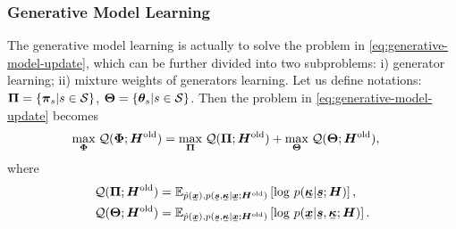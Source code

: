 \documentclass[letterpaper]{article} %
\newcommand{\ubar}[1]{\mkern2mu\underline{\mkern-2mu #1\mkern-2mu}\mkern2mu}
\newcommand{\ubm}[1]{\ubar{\bm{#1}}}
\begin{document}
\subsubsection{Generative Model Learning}
The generative model learning is actually to solve the problem in \eqref{eq:generative-model-update}, which can be further divided into two subproblems: i) generator learning; ii) mixture weights of generators learning. Let us define notations:
$\bm{\Pi} = \left\{  \bm{\pi}_{s}| s\in \mathcal{S} \right\}$, $\bm{\Theta}=\left\{ \bm{\theta}_s| s\in \mathcal{S} \right\}$. 
Then the problem in \eqref{eq:generative-model-update} becomes
\begin{align}\label{eq:sub-gm}
  &\underset{\bm{\Phi}}{\max}\; \mathcal{Q}(\bm{\Phi}; \bm{H}^{\mathrm{old}}) = \underset{\bm{\Pi}}{\max}\; \mathcal{Q}(\bm{\Pi}; \bm{H}^{\mathrm{old}}) + \underset{\bm{\Theta}}{\max}\; \mathcal{Q}(\bm{\Theta}; \bm{H}^{\mathrm{old}}),
\end{align}
where
\begin{align}
  \Qq(\bm{\Pi}; \bm{H}^{\mathrm{old}})  &=\EE_{\hat{p}(\ubm{x}),p(\ubm{s},\ubm{\kappa}| \ubm{x}; \bm{H}^{\mathrm{old}})}\left[  \log\,p(\ubm{\kappa}| \ubm{s}; \bm{H})\right], \\
  \Qq(\bm{\Theta}; \bm{H}^{\mathrm{old}}) &=\EE_{\hat{p}(\ubm{x}),p(\ubm{s},\ubm{\kappa}| \ubm{x}; \bm{H}^{\mathrm{old}})}\left[  \log\,p(\ubm{x}| \ubm{s},\ubm{\kappa}; \bm{H})\right].
\end{align}
\end{document}
